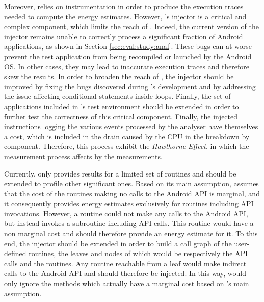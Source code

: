Moreover, \orka{} relies on instrumentation in order to produce the execution traces needed to compute the energy estimates.
However, \orka{}'s injector is a critical and complex component, which limits the reach of \orka{}.
Indeed, the current version of the injector remains unable to correctly process a significant fraction of Android applications, as shown in Section \ref{sec:eval:study:anal}.
These bugs can at worse prevent the test application from being recompiled or launched by the Android OS.
In other cases, they may lead to inaccurate execution traces and therefore skew the results.
In order to broaden the reach of \orka{}, the injector should be improved by fixing the bugs discovered during \orka{}'s development and by addressing the issue affecting conditional statements inside loops.
Finally, the set of applications included in \orka{}'s test environment should be extended in order to further test the correctness of this critical component.
Finally, the injected instructions logging the various events processed by the analyser have themselves a cost, which is included in the drain caused by the CPU in the breakdown by component.
Therefore, this process exhibit the \textit{Hawthorne Effect}, in which the measurement process affects by the measurements.

Currently, \orka{} only provides results for a limited set of routines and should be extended to profile other significant ones.
Based on its main assumption, \orka{} assumes that the cost of the routines making no calls to the Android API is marginal, and it consequently provides energy estimates exclusively for routines including API invocations.
However, a routine could not make any calls to the Android API, but instead invokes a subroutine including API calls.
This routine would have a non marginal cost and \orka{} should therefore provide an energy estimate for it.
To this end, the injector should be extended in order to build a call graph of the user-defined routines, the leaves and nodes of which would be respectively the API calls and the routines.
Any routine reachable from a leaf would make indirect calls to the Android API and should therefore be injected.
In this way, \orka{} would only ignore the methods which actually have a marginal cost based on \orka{}'s main assumption.

